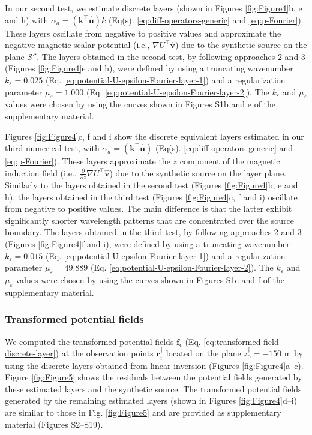In our second test, we estimate discrete layers (shown in Figures \ref{fig:Figure4}b, e and h) 
with $\alpha_{a} = \left(\mathbf{k}^{\top} \hat{\mathbf{u}} \right) k$ 
(Eq(s). \ref{eq:diff-operators-generic} and \ref{eq:p-Fourier}).
These layers oscillate from negative to positive values and approximate 
the negative magnetic scalar 
potential (i.e., $\nabla U^{\top} \hat{\mathbf{v}}$) due to the synthetic source on the plane $\mathcal{S}''$.
The layers obtained in the second test, by following approaches 2 and 3 
(Figures \ref{fig:Figure4}e and h), were defined by using a truncating wavenumber 
$k_{\varepsilon} = 0.025$ (Eq. \ref{eq:potential-U-epsilon-Fourier-layer-1})
and a regularization parameter $\mu_{\varepsilon} = 1.000$ 
(Eq. \ref{eq:potential-U-epsilon-Fourier-layer-2}). 
The $k_{\varepsilon}$ and $\mu_{\varepsilon}$ values were chosen by using the curves shown 
in Figures S1b and e of the supplementary material.

Figures \ref{fig:Figure4}c, f and i show the discrete equivalent layers estimated in our 
third numerical test, with $\alpha_{a} = \left(\mathbf{k}^{\top} \hat{\mathbf{u}} \right)$ 
(Eq(s). \ref{eq:diff-operators-generic} and \ref{eq:p-Fourier}). 
These layers approximate the $z$ component of the magnetic induction field 
(i.e., $\tfrac{\partial}{\partial z}\nabla U^{\top} \hat{\mathbf{v}}$) due to the 
synthetic source on the layer plane.
Similarly to the layers obtained in the second test (Figures \ref{fig:Figure4}b, e and h), 
the layers obtained in the third test (Figures \ref{fig:Figure4}c, f and i) oscillate from
negative to positive values. 
The main difference is that the latter exhibit significantly shorter wavelength patterns that
are concentrated over the source boundary.
The layers obtained in the third test, by following approaches 2 and 3 
(Figures \ref{fig:Figure4}f and i), were defined by using a truncating wavenumber 
$k_{\varepsilon} = 0.015$ (Eq. \ref{eq:potential-U-epsilon-Fourier-layer-1})
and a regularization parameter $\mu_{\varepsilon} = 49.889$ 
(Eq. \ref{eq:potential-U-epsilon-Fourier-layer-2}). 
The $k_{\varepsilon}$ and $\mu_{\varepsilon}$ values were chosen by using the curves shown 
in Figures S1c and f of the supplementary material.

\subsubsection{Transformed potential fields}

We computed the transformed potential fields $\mathbf{f}_{\epsilon}$ (Eq. \ref{eq:transformed-field-discrete-layer}) 
at the observation points $\mathbf{r}^{\dagger}_{i}$ located on the plane $z^{\dagger}_{0} = -150$ m by using the discrete 
layers obtained from linear inversion (Figures \ref{fig:Figure4}a–c). Figure \ref{fig:Figure5} shows the residuals 
between the potential fields generated by these estimated layers and the synthetic source. The transformed potential 
fields generated by the remaining estimated layers (shown in Figures \ref{fig:Figure4}d–i) are 
similar to those in Fig. \ref{fig:Figure5} and are provided as supplementary material
(Figures S2--S19).

